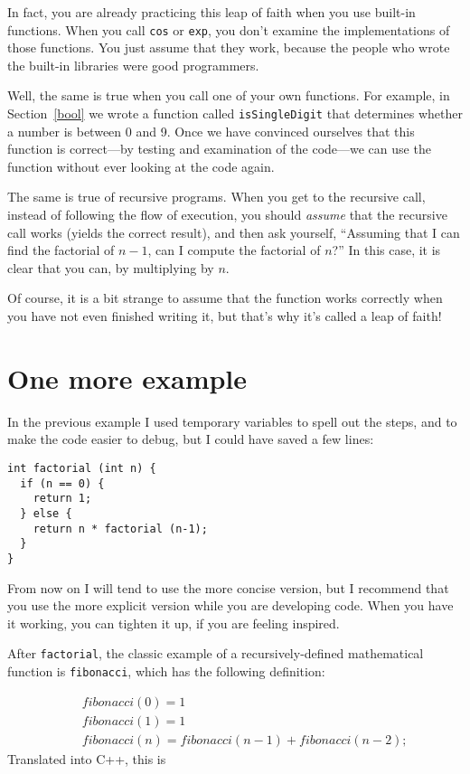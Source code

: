 In fact, you are already practicing this leap of faith
when you use built-in functions.  When you call {\tt cos}
or {\tt exp}, you don't examine the implementations of 
those functions.  You just assume that they work, because the people
who wrote the built-in libraries were good programmers.

Well, the same is true when you call one of your own functions.
For example, in Section~\ref{bool} we wrote a function called
{\tt isSingleDigit} that determines whether a number is between
0 and 9.  Once we have convinced ourselves that this function
is correct---by testing and examination of the code---we can
use the function without ever looking at the code again.

The same is true of recursive programs.  When you get to the recursive
call, instead of following the flow of execution, you should {\em
assume} that the recursive call works (yields the correct result), and
then ask yourself, ``Assuming that I can find the factorial of $n-1$,
can I compute the factorial of $n$?''  In this case, it is clear that
you can, by multiplying by $n$.

Of course, it is a bit strange to assume that the function works
correctly when you have not even finished writing it, but that's why
it's called a leap of faith!

\section{One more example}

In the previous example I used temporary variables to spell out the
steps, and to make the code easier to debug, but I could have saved a
few lines:

\begin{verbatim}
int factorial (int n) {
  if (n == 0) {
    return 1;
  } else {
    return n * factorial (n-1);
  }
}
\end{verbatim}
%
From now on I will tend to use the more concise version, but
I recommend that you use the more explicit version while you
are developing code.   When you have it working, you can
tighten it up, if you are feeling inspired.

After {\tt factorial}, the classic example of a recursively-defined
mathematical function is {\tt fibonacci}, which has the
following definition:

\begin{eqnarray*}
&& fibonacci(0) = 1 \\
&& fibonacci(1) = 1 \\
&& fibonacci(n) = fibonacci(n-1) + fibonacci(n-2);
\end{eqnarray*}
%
Translated into C++, this is

